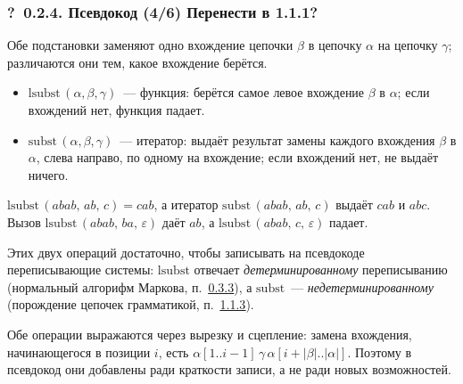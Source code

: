 \documentclass[mathserif,12pt,aspectratio=169]{beamer}
\def\emразделенной{\em разделенной}
\def\em#1{\it\color{blue}#1}
\def\NB#1{{\bf\color{brown}#1}}
\def\DMref#1#2{{\color{blue}\underline{\hyperlink{#2}{#1}}}}
\def\Qm{{\color{brown}\textbf{?}\ }}
\begin{document}
\begin{frame}
\frametitle{\Qm 0.2.4. Псевдокод (4/6) \NB{Перенести в 1.1.1?}}

Обе подстановки заменяют одно вхождение цепочки $\beta$ в цепочку $\alpha$ на
цепочку $\gamma$; различаются они тем, какое вхождение берётся.

\vspace{-2pt}
\begin{itemize}
\item $\mathrm{lsubst}\,(\alpha,\beta,\gamma)$~--- функция: берётся самое левое
вхождение $\beta$ в $\alpha$; если вхождений нет, функция падает.
\item $\mathrm{subst}\,(\alpha,\beta,\gamma)$~--- итератор: выдаёт результат
замены каждого вхождения $\beta$ в $\alpha$, слева направо, по одному на
вхождение; если вхождений нет, не выдаёт ничего.
\end{itemize}
\vspace{-2pt}

\begin{examples}
$\mathrm{lsubst}\,(abab,\,ab,\,c)=cab$, а итератор $\mathrm{subst}\,(abab,\,ab,\,c)$
выдаёт $cab$ и $abc$. Вызов $\mathrm{lsubst}\,(abab,\,ba,\,\varepsilon)$ даёт
$ab$, а $\mathrm{lsubst}\,(abab,\,c,\,\varepsilon)$ падает.
\end{examples}

Этих двух операций достаточно, чтобы записывать на псевдокоде переписывающие
системы: $\mathrm{lsubst}$ отвечает {\em детерминированному} переписыванию
(нормальный алгорифм Маркова, п.~\DMref{0.3.3}{0.3.3}), а $\mathrm{subst}$~---
{\em недетерминированному} (порождение цепочек грамматикой,
п.~\DMref{1.1.3}{1.1.3}).

\begin{remark}
Обе операции выражаются через вырезку и сцепление: замена вхождения, начинающегося
в позиции $i$, есть $\alpha[1..i-1]\,\gamma\,\alpha[i+|\beta|..|\alpha|]$.
Поэтому в псевдокод они добавлены ради краткости записи, а не ради новых
возможностей.
\end{remark}
\end{frame}
\end{document}

